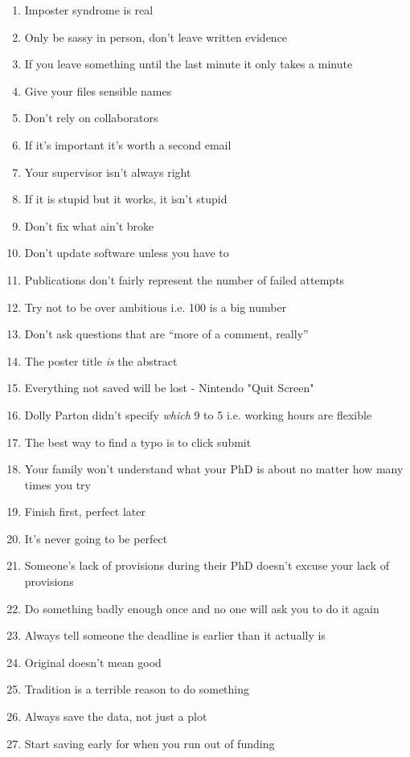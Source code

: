 \begin{enumerate}
	\item Imposter syndrome is real \cite{langford1993}
	\item Only be sassy in person, don't leave written evidence
	\item If you leave something until the last minute it only takes a minute
	\item Give your files sensible names
	\item Don't rely on collaborators
	\item If it's important it's worth a second email
	\item Your supervisor isn't always right
	\item If it is stupid but it works, it isn't stupid
	\item Don't fix what ain't broke
	\item Don't update software unless you have to
	\item Publications don't fairly represent the number of failed attempts
	\item Try not to be over ambitious i.e. 100 is a big number
	\item Don't ask questions that are ``more of a comment, really''
	\item The poster title \textit{is} the abstract
	\item Everything not saved will be lost - Nintendo "Quit Screen"
	\item Dolly Parton didn't specify \textit{which} 9 to 5 i.e. working hours are flexible
	\item The best way to find a typo is to click submit
	\item Your family won't understand what your PhD is about no matter how many times you try
	\item Finish first, perfect later
	\item It's never going to be perfect
	\item Someone's lack of provisions during their PhD doesn't excuse your lack of provisions
	\item Do something badly enough once and no one will ask you to do it again
	\item Always tell someone the deadline is earlier than it actually is
	\item Original doesn't mean good
	\item Tradition is a terrible reason to do something
	\item Always save the data, not just a plot
	\item Start saving early for when you run out of funding 

\end{enumerate}
